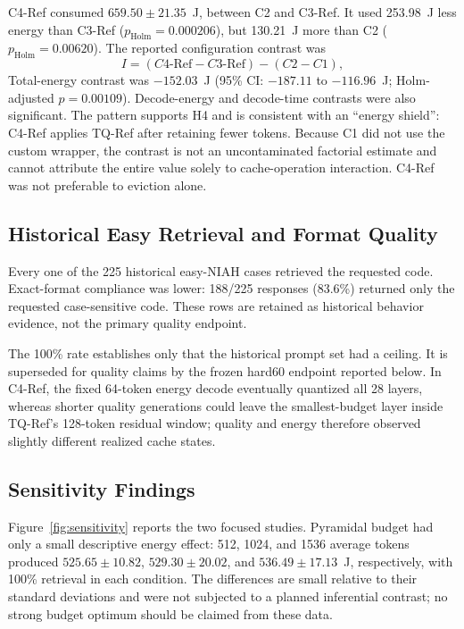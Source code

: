 \documentclass[conference]{IEEEtran}
\begin{document}
C4-Ref consumed $659.50\pm21.35$~J, between C2 and C3-Ref. It used 253.98~J less energy than C3-Ref ($p_{\mathrm{Holm}}=0.000206$), but 130.21~J more than C2 ($p_{\mathrm{Holm}}=0.00620$). The reported configuration contrast was
\begin{equation}
I=(C4\text{-Ref}-C3\text{-Ref})-(C2-C1),
\end{equation}
Total-energy contrast was $-152.03$~J (95\% CI: $-187.11$ to $-116.96$~J; Holm-adjusted $p=0.00109$). Decode-energy and decode-time contrasts were also significant. The pattern supports H4 and is consistent with an ``energy shield'': C4-Ref applies TQ-Ref after retaining fewer tokens. Because C1 did not use the custom wrapper, the contrast is not an uncontaminated factorial estimate and cannot attribute the entire value solely to cache-operation interaction. C4-Ref was not preferable to eviction alone.

\subsection{Historical Easy Retrieval and Format Quality}

Every one of the 225 historical easy-NIAH cases retrieved the requested code. Exact-format compliance was lower: 188/225 responses (83.6\%) returned only the requested case-sensitive code. These rows are retained as historical behavior evidence, not the primary quality endpoint.

The 100\% rate establishes only that the historical prompt set had a ceiling. It is superseded for quality claims by the frozen hard60 endpoint reported below. In C4-Ref, the fixed 64-token energy decode eventually quantized all 28 layers, whereas shorter quality generations could leave the smallest-budget layer inside TQ-Ref's 128-token residual window; quality and energy therefore observed slightly different realized cache states.

\subsection{Sensitivity Findings}

Figure~\ref{fig:sensitivity} reports the two focused studies. Pyramidal budget had only a small descriptive energy effect: 512, 1024, and 1536 average tokens produced $525.65\pm10.82$, $529.30\pm20.02$, and $536.49\pm17.13$~J, respectively, with 100\% retrieval in each condition. The differences are small relative to their standard deviations and were not subjected to a planned inferential contrast; no strong budget optimum should be claimed from these data.
\end{document}

